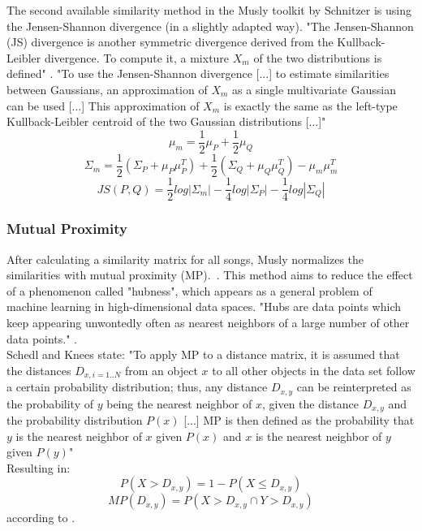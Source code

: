 The second available similarity method in the Musly toolkit by Schnitzer is using the Jensen-Shannon divergence (in a slightly adapted way). "The Jensen-Shannon (JS) divergence is another symmetric divergence derived from the Kullback-Leibler divergence. To compute it, a mixture $X_m$ of the two distributions is defined" \cite[p. 43]{schnitzer1}. "To use the Jensen-Shannon divergence [...] to estimate similarities between Gaussians, an approximation of $X_m$ as a single multivariate Gaussian can be used [...] This approximation of $X_m$ is exactly the same as the left-type Kullback-Leibler centroid of the two Gaussian distributions [...]" \cite[p. 45]{schnitzer1} 
\begin{equation} \label{eq:jsl1}
\mu_m = \frac{1}{2} \mu_P + \frac{1}{2} \mu_Q
\end{equation}
\begin{equation} \label{eq:jsl2}
\Sigma_m = \frac{1}{2} (\Sigma_P + \mu_P\mu_P^T) + \frac{1}{2} (\Sigma_Q + \mu_Q\mu_Q^T) - \mu_m\mu_m^T
\end{equation}
\begin{equation} \label{eq:jsl3}
JS(P, Q) = \frac{1}{2} log|\Sigma_m| - \frac{1}{4} log |\Sigma_P| - \frac{1}{4} log |\Sigma_Q|
\end{equation}

\subsubsection{Mutual Proximity}\label{mprox}
After calculating a similarity matrix for all songs, Musly normalizes the similarities with mutual proximity (MP).~\cite{musly2}. This method aims to reduce the effect of a phenomenon called "hubness", which appears as a general problem of machine learning in high-dimensional data spaces. "Hubs are data points which keep appearing unwontedly often as nearest neighbors of a large number of other data points." \cite[p. 66]{schnitzer1}.\\
Schedl and Knees state: "To apply MP to a distance matrix, it is assumed that the distances $D_{x,i = 1..N}$ from an object $x$ to all other objects in the data set follow a certain probability distribution; thus, any distance $D_{x,y}$ can be reinterpreted as the probability of $y$ being the nearest neighbor of $x$, given the distance $D_{x,y}$ and the probability distribution $P(x)$ [...] MP is then defined as the probability that $y$ is the nearest neighbor of $x$ given $P(x)$ and $x$ is the nearest neighbor of $y$ given $P(y)$" \cite[p. 80]{knees1}\\
Resulting in: 
\begin{equation} \label{eq:mp1}
P(X > D_{x,y}) = 1 - P(X \leq D_{x,y})%
\end{equation}
\begin{equation} \label{eq:mp2}
MP(D_{x,y}) = P(X > D_{x,y} \cap Y > D_{x,y})
\end{equation}
according to \cite[p. 80]{knees1}.\\

